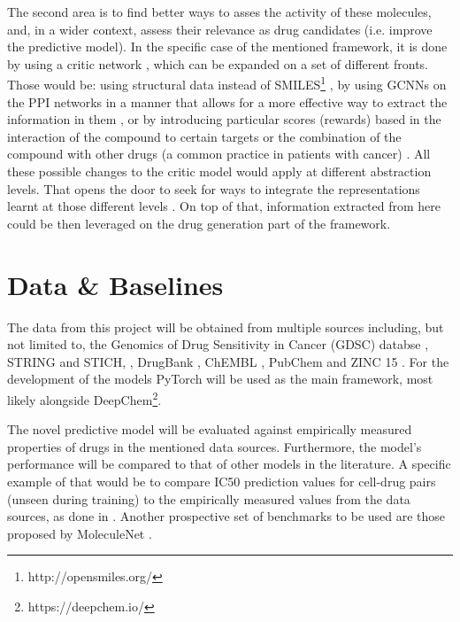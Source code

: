 \documentclass{article}
\begin{document}
 The second area is to find better ways to asses the activity of these molecules, and,
 in a wider context, assess their relevance as drug candidates (i.e. improve the
 predictive model). In the specific case of the mentioned framework, it is done by using
 a critic network \cite{Manica2019}, which can be expanded on a set of different fronts.
 Those would be: using structural data instead of
 SMILES\footnote{http://opensmiles.org/} \cite{Li, Do2019}, {\color{red} by using GCNNs
 on the PPI networks in a manner that allows for a more effective way to extract the
 information in them} \cite{Oskooei2019, Wang2019}, or by introducing particular scores
 (rewards) based in the interaction of the compound to certain targets
 \cite{YingkaiGao2018, Zhavoronkov2019} or the combination of the compound with other
 drugs (a common practice in patients with cancer) \cite{Zitnik2018}. All these possible
 changes to the critic model would apply at different abstraction levels. That opens the
 door to seek for ways to integrate the representations learnt at those different levels
 \cite{Ying2018, Ma2019, Huang2019}. On top of that, information extracted from here
 could be then leveraged on the drug generation part of the framework.


    \section*{Data \& Baselines}

The data from this project will be obtained from multiple sources including, but not
 limited to, the Genomics of Drug Sensitivity in Cancer (GDSC) databse \cite{Yang2013},
 STRING and STICH, \cite{Szklarczyk2019,Szklarczyk2016}, DrugBank \cite{Wishart2006},
 ChEMBL \cite{Gaulton2017}, PubChem \cite{Kim2019} and ZINC 15 \cite{Sterling2015}. For
 the development of the models PyTorch \cite{Paszke2019} will be used as the main
 framework, most likely alongside DeepChem\footnote{https://deepchem.io/}.

The novel predictive model will be evaluated against empirically measured properties of
 drugs in the mentioned data sources. Furthermore, the model's performance will be
 compared to that of other models in the literature. A specific example of that would be
 to compare IC50 prediction values for cell-drug pairs (unseen during training) to the
 empirically measured values from the data sources, as done in \cite{Oskooei2019,
 Joo2019, Oskooei2018}. Another prospective set of benchmarks to be used are those
 proposed by MoleculeNet \cite{Wu2018}.
\end{document}
